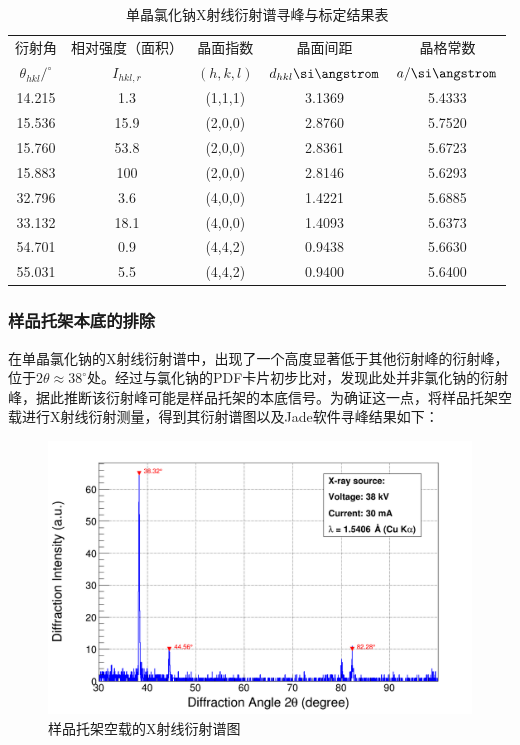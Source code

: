 \documentclass{thuemp}
\begin{document}
\begin{table}[H]
    \centering
    \captionnamefont{\wuhao\bf\heiti}
    \captiontitlefont{\wuhao\bf\heiti}
    \caption{单晶氯化钠X射线衍射谱寻峰与标定结果表}
    \label{tab:nacl_xrd_single}
    \begin{tabular}{ccccc}
        \toprule
        衍射角 & 相对强度（面积）& 晶面指数 & 晶面间距 & 晶格常数 \\
        $\theta_{hkl}/^\circ$ & $I_{hkl,r}$ & $(h,k,l)$ & $d_{hkl}\text{\si\angstrom}$ & $a/\text{\si\angstrom}$ \\
        \midrule
        14.215 &  1.3 & (1,1,1) & 3.1369 & 5.4333\\
        15.536 & 15.9 & (2,0,0) & 2.8760 & 5.7520\\
        15.760 & 53.8 & (2,0,0) & 2.8361 & 5.6723\\
        15.883 &  100 & (2,0,0) & 2.8146 & 5.6293\\
        32.796 &  3.6 & (4,0,0) & 1.4221 & 5.6885\\
        33.132 & 18.1 & (4,0,0) & 1.4093 & 5.6373\\
        54.701 &  0.9 & (4,4,2) & 0.9438 & 5.6630\\
        55.031 &  5.5 & (4,4,2) & 0.9400 & 5.6400\\
        \bottomrule
    \end{tabular}
\end{table}

\subsubsection{样品托架本底的排除}

在单晶氯化钠的X射线衍射谱中，出现了一个高度显著低于其他衍射峰的衍射峰，位于$2\theta \approx 38^\circ$处。经过与氯化钠的PDF卡片初步比对，发现此处并非氯化钠的衍射峰，据此推断该衍射峰可能是样品托架的本底信号。为确证这一点，将样品托架空载进行X射线衍射测量，得到其衍射谱图以及Jade软件寻峰结果如下：

\begin{figure}[H]
    \centering
    \includegraphics[width=0.8\linewidth]{../Data/Background-from-manifold.png}
    \caption{样品托架空载的X射线衍射谱图}
    \label{fig:nacl_xrd_holder}
\end{figure}
\end{document}
